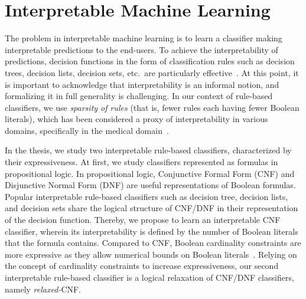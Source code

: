 \section{Interpretable Machine Learning}
The problem in interpretable machine learning is to learn a classifier making interpretable predictions to the end-users. To achieve the interpretability of predictions, decision functions in the form of classification rules such as decision trees,  decision lists, decision sets, etc.\ are particularly effective~\cite{bessiere2009minimising,dash2021lprules,ignatiev2021reasoning,izza2020explaining,lakkaraju2017interpretable,lakkaraju2016interpretable,letham2015interpretable,narodytska2018learning,rivest1987learning,wang2015falling,yu2020optimal}.  At this point, it is important to acknowledge that interpretability is an informal notion, and formalizing it in full generality is challenging. In our context of rule-based classifiers, we use \emph{sparsity of rules} (that is, fewer rules each having fewer Boolean literals), which has been considered a proxy of interpretability in various domains, specifically in the medical domain~\cite{gage2001validation,lakkaraju2019faithful,letham2015interpretable,malioutov2013exact,myers1962myers}.





In the thesis, we study two interpretable rule-based classifiers, characterized by their expressiveness. At first, we study classifiers represented as formulas in propositional logic. In propositional logic, Conjunctive Formal Form (CNF) and Disjunctive Normal Form (DNF) are useful representations of Boolean formulas. Popular interpretable rule-based classifiers such as decision tree, decision lists, and decision sets share the logical structure of CNF/DNF in their representation of the decision function. Thereby, we propose to learn an interpretable CNF classifier, wherein its interpretability is defined by the number of Boolean literals that the formula contains. Compared to CNF, Boolean cardinality constraints are more expressive as they allow numerical bounds on Boolean literals~\cite{sinz2005towards}. Relying on the concept of cardinality constraints to increase expressiveness, our second interpretable rule-based classifier is a logical relaxation of CNF/DNF classifiers, namely \emph{relaxed-}CNF. 


